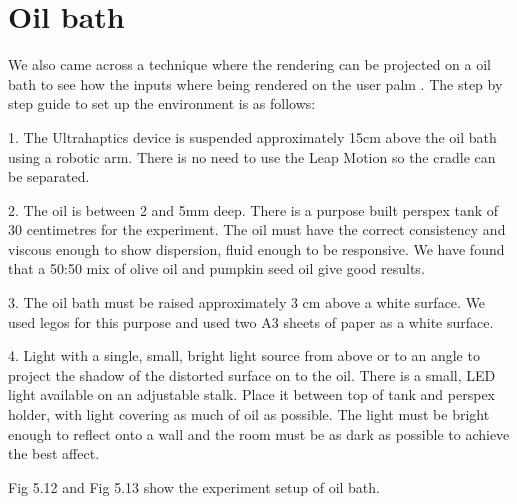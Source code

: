 \section{Oil bath}
\label{sec:validation:oilbath}

We also came across a technique where the rendering can be projected on a oil bath to see how the inputs where being rendered on the user palm \cite{oil}. The step by step guide to set up the environment is as follows:

1. The Ultrahaptics device is suspended approximately 15cm above the oil bath using a robotic arm. There is no need to use the Leap Motion so the cradle can be separated. 

2. The oil is between 2 and 5mm deep. There is a purpose built perspex tank of 30 centimetres for the experiment. The oil must have the correct consistency and viscous enough to show dispersion, fluid enough to be responsive. We have found that a 50:50 mix of olive oil and pumpkin seed oil give good results. 

3. The oil bath must be raised approximately 3 cm above a white surface. We used legos for this purpose and used two A3 sheets of paper as a white surface.

4. Light with a single, small, bright light source from above or to an angle to project the shadow of the distorted surface on to the oil. There is a small, LED light available on an adjustable stalk. Place it between top of tank and perspex holder, with light covering as much of oil as possible. The light must be bright enough to reflect onto a wall and the room must be as dark as possible to achieve the best affect.

Fig 5.12 and Fig 5.13 show the experiment setup of oil bath. 

